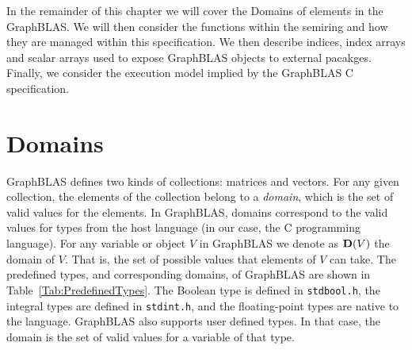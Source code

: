 In the remainder of this chapter we will cover the Domains of 
elements in the GraphBLAS.  We will then consider the functions
within the semiring and how they are managed within this specification.
We then describe indices, index arrays and scalar arrays used
to expose GraphBLAS objects to external pacakges.  Finally, we consider 
the execution model implied by the GraphBLAS C specification.

\section{Domains}

GraphBLAS defines two kinds of collections: matrices and vectors.
For any given collection, the elements of the collection belong to
a \emph{domain}, which is the set of valid values for the elements.
In GraphBLAS, domains correspond to the valid values for types from
the host language (in our case, the C programming language).  For any
variable or object $V$ in GraphBLAS we denote as $\bold{D}(V)$ the
domain of $V$. That is, the set of possible values that elements of
$V$ can take.  The predefined types, and corresponding domains, of
GraphBLAS are shown in Table~\ref{Tab:PredefinedTypes}.  The Boolean
type is defined in {\tt stdbool.h}, the integral types are defined in
{\tt stdint.h}, and the floating-point types are native to the language.
GraphBLAS also supports user defined types. In that case, the domain is
the set of valid values for a variable of that type.

